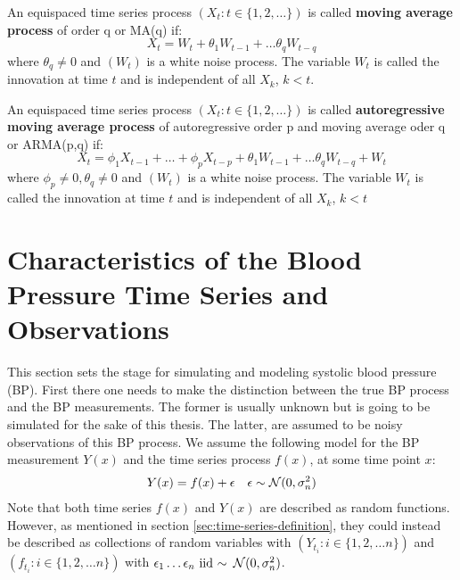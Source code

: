 \begin{example}
    An equispaced time series process $(X_t: t \in \{1,2, \dots\})$ is called \textbf{moving average process}
    of order q or MA(q) if:
    \[
        X_t = W_t + \theta_1 W_{t-1} + \dots \theta_q W_{t-q}
    \]
    where $\theta_q \neq 0$ and $(W_t)$ is a white noise process.
    The variable $W_t$ is called the innovation at time $t$ and is independent of all $X_k$, $k < t$.
\end{example}


\begin{example}
    An equispaced time series process $(X_t: t \in \{1,2, \dots\})$ is called \textbf{autoregressive moving average process}
    of autoregressive order p and moving average oder q or ARMA(p,q) if:
    \[
        X_t =  \phi_1 X_{t-1} + \dots + \phi_p X_{t-p} + \theta_1 W_{t-1} + \dots \theta_q W_{t-q} + W_t
    \]
    where $\phi_p \neq 0, \theta_q \neq 0$ and $(W_t)$ is a white noise process.
    The variable $W_t$ is called the innovation at time $t$ and is independent of all $X_k$, $k < t$

\end{example}




\section{Characteristics of the Blood Pressure Time Series and Observations}\label{sec:characteristics-of-the-blood-pressure-time-series}

This section sets the stage for simulating and modeling systolic blood pressure (BP).
First there one needs to make the distinction between the
true BP process and the BP measurements.
The former is usually unknown but is going to be simulated for the sake of this thesis.
The latter, are assumed to be noisy observations of this BP process.
We assume the following model for the BP measurement $Y(x)$
and the time series process $f(x)$, at some time point $x$:
\begin{align*}
    Y(x) = f(x) + \epsilon && \epsilon \sim \operatorname{\mathcal{N}}(0, \sigma_n^{2})
\end{align*}
Note that both time series $f(x)$ and $Y(x)$ are described as random
functions. However, as mentioned in section \ref{sec:time-series-definition},
they could instead be described as collections of random variables with
$(Y_{t_i}: i \in \{1, 2, \dots n\})$ and $(f_{t_i}: i \in \{1, 2, \dots n\})$ with
$\epsilon_1 \dots \epsilon_n \text{ iid }{\sim} \text{ } \operatorname{\mathcal{N}}(0, \sigma_n^{2})$.

